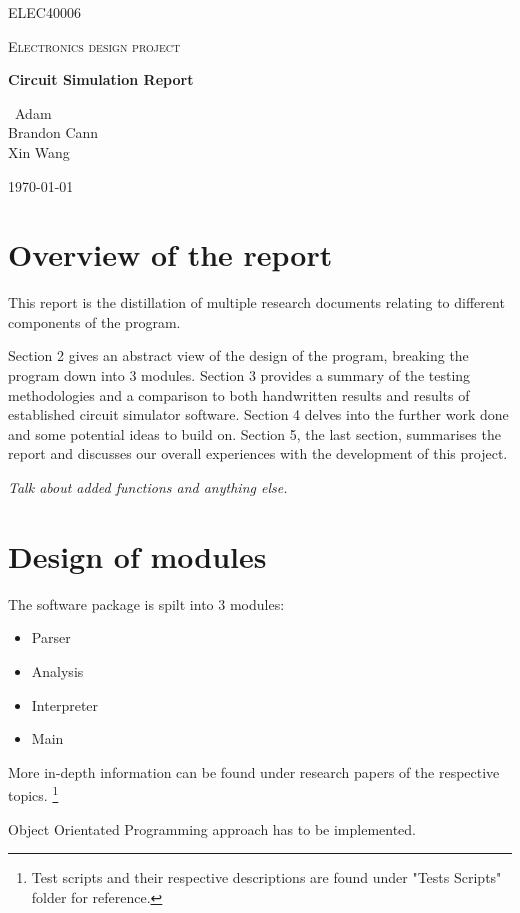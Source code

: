 \documentclass[12pt,a4paper]{article}
\begin{document}
\begin{titlepage}
	\centering
	{\scshape\LARGE ELEC40006 \par}
	\vspace{1cm}
	{\scshape\Large Electronics design project\par}
	\vspace{1.5cm}
	{\huge\bfseries Circuit Simulation Report\par}
	\vspace{2cm}
	{\Large\ Adam\\ Brandon Cann\\ Xin Wang \par}
	\vfill
	{\large \today\par}
\end{titlepage}

\tableofcontents
\pagebreak

\begin{abstract}
This report describes the design and implementation of a program that is capable of performing a transient simulation
by calculating the node voltages at each successive instant in time. This program parses the netlist file
into a graph data structure, performs analysis using conductance matrices and outputs the results in a CSV format.

-- How accurate is it?
\par
-- Comaparison to commercial software?
\end{abstract}
\pagebreak
\section{Overview of the report}
This report is the distillation of multiple research documents relating to different components of the program. \par
Section 2 gives an abstract view of the design of the program, breaking the program down into 3 modules.
Section 3 provides a summary of the testing methodologies and a comparison to both handwritten results and results of 
established circuit simulator software. 
Section 4 delves into the further work done and some potential ideas to build on.
Section 5, the last section, summarises the report and discusses our overall experiences with the development of this project.
\par
\textit{Talk about added functions and anything else.}
\pagebreak
\section{Design of modules}
The software package is spilt into 3 modules:
\begin{itemize}
	\item Parser
	\item Analysis
	\item Interpreter
	\item Main
\end{itemize}
More in-depth information can be found under research papers of the respective topics.
\footnote{Test scripts and their respective descriptions are found under "Tests Scripts" folder for reference.}
\par
Object Orientated Programming approach has to be implemented.
\end{document}
